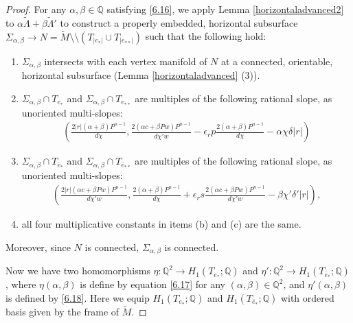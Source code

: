 \documentclass{amsart}
\numberwithin{equation}{section}
\theoremstyle{definition}
\begin{document}
\begin{proof}
For any $\alpha,\beta\in \mathbb{Q}$ satisfying \eqref{6.16}, we apply Lemma \ref{horizontaladvanced2} to $\alpha\tilde{\Lambda}+\beta\tilde{\Lambda}'$ to construct a properly embedded, horizontal subsurface $\Sigma_{\alpha,\beta}\to N=\tilde{M}\setminus\setminus (T_{|e_*|}\cup T_{|e_{**}|})$ such that the following hold:
\begin{enumerate}
\item[(a)] $\Sigma_{\alpha,\beta}$ intersects with each vertex manifold of $N$ at a connected, orientable, horizontal subsurface (Lemma \ref{horizontaladvanced} (3)).
\item[(b)] $\Sigma_{\alpha,\beta}\cap T_{e_*}$ and $\Sigma_{\alpha,\beta}\cap T_{e_{**}}$ are multiples of the following rational slope, as unoriented multi-slopes:
\begin{align}\label{6.17}
(\frac{2|r|(\alpha+\beta)P^{n-1}}{d\chi},
\frac{2(\alpha c+\beta Pw)P^{n-1}}{d\chi'w}-
\epsilon_r p\frac{2(\alpha+\beta)P^{n-1}}{d\chi}
-\alpha\chi\delta|r|)
\end{align}
\item[(c)] $\Sigma_{\alpha,\beta}\cap T_{\bar{e}_*}$ and $\Sigma_{\alpha,\beta}\cap T_{\bar{e}_{**}}$ are multiples of the following rational slope, as unoriented multi-slopes:
\begin{align}\label{6.18}
(\frac{2|r|(\alpha c+\beta Pw)P^{n-1}}{d\chi'w},
\frac{2(\alpha+\beta)P^{n-1}}{d\chi}+
\epsilon_r s\frac{2(\alpha c+\beta Pw)P^{n-1}}{d\chi'w}
-\beta\chi'\delta'|r|),
\end{align}
\item[(d)] all four multiplicative constants in items (b) and (c) are the same. 
\end{enumerate}
Moreover, since $N$ is connected, $\Sigma_{\alpha,\beta}$ is connected.

Now we have two homomorphisms $\eta:\mathbb{Q}^2\to H_1(T_{e_*};\mathbb{Q})$ and $\eta':\mathbb{Q}^2\to H_1(T_{\bar{e}_*};\mathbb{Q})$, where $\eta(\alpha,\beta)$ is define by equation \eqref{6.17} for any $(\alpha,\beta)\in \mathbb{Q}^2$, and $\eta'(\alpha,\beta)$ is defined by \eqref{6.18}. Here we equip $H_1(T_{e_*};\mathbb{Q})$ and $H_1(T_{\bar{e}_*};\mathbb{Q})$ with ordered basis given by the frame of $\tilde{M}$.


\end{proof}
\end{document}
